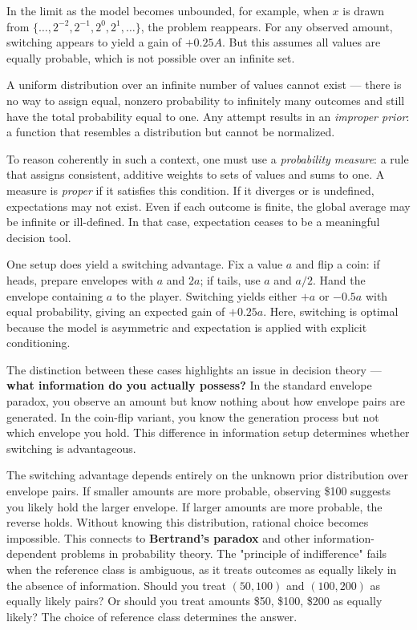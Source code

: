 In the limit as the model becomes unbounded, for example, when \( x \) is drawn from \( \{\dots, 2^{-2}, 2^{-1}, 2^0, 2^1, \dots\} \), the problem reappears. For any observed amount, switching appears to yield a gain of \( +0.25A \). But this assumes all values are equally probable, which is not possible over an infinite set.

A uniform distribution over an infinite number of values cannot exist — there is no way to assign equal, nonzero probability to infinitely many outcomes and still have the total probability equal to one. Any attempt results in an \emph{improper prior}: a function that resembles a distribution but cannot be normalized.

To reason coherently in such a context, one must use a \emph{probability measure}: a rule that assigns consistent, additive weights to sets of values and sums to one. A measure is \emph{proper} if it satisfies this condition. If it diverges or is undefined, expectations may not exist. Even if each outcome is finite, the global average may be infinite or ill-defined. In that case, expectation ceases to be a meaningful decision tool.

One setup does yield a switching advantage. Fix a value \( a \) and flip a coin: if heads, prepare envelopes with \( a \) and \( 2a \); if tails, use \( a \) and \( a/2 \). Hand the envelope containing \( a \) to the player. Switching yields either \( +a \) or \( -0.5a \) with equal probability, giving an expected gain of \( +0.25a \). Here, switching is optimal because the model is asymmetric and expectation is applied with explicit conditioning.

The distinction between these cases highlights an issue in decision theory — \textbf{what information do you actually possess?} In the standard envelope paradox, you observe an amount but know nothing about how envelope pairs are generated. In the coin-flip variant, you know the generation process but not which envelope you hold. This difference in information setup determines whether switching is advantageous.

The switching advantage depends entirely on the unknown prior distribution over envelope pairs. If smaller amounts are more probable, observing \$100 suggests you likely hold the larger envelope. If larger amounts are more probable, the reverse holds. Without knowing this distribution, rational choice becomes impossible.
This connects to \textbf{Bertrand's paradox} and other information-dependent problems in probability theory. The "principle of indifference" fails when the reference class is ambiguous, as it treats outcomes as equally likely in the absence of information. Should you treat $(50, 100)$ and $(100, 200)$ as equally likely pairs? Or should you treat amounts \$50, \$100, \$200 as equally likely? The choice of reference class determines the answer.

